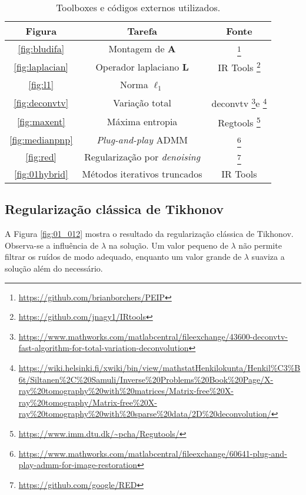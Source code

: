 {\centering 
\begin{longtable}{|| c  c  c || }
\caption{Toolboxes e códigos externos utilizados.}
\label{Table:especificacoes_estudo}  \\ \hline
 \rowcolor{lightyellow} \textbf{Figura} & \textbf{Tarefa} & \textbf{Fonte} \\ \hline\hline
\ref{fig:bludifa} & Montagem de $\mathbf{A}$ &  \cite[Exemplo 6.2]{aster2019parameter}\footnote{\url{https://github.com/brianborchers/PEIP}} \\
\ref{fig:laplacian} & Operador laplaciano $\mathbf{L}$ & IR Tools \cite{Gazzola2018}\footnote{\url{https://github.com/jnagy1/IRtools}} \\
\ref{fig:l1} & Norma $\ell_1$& \cite[Algoritmos 7.2-4]{aster2019parameter}\\
\ref{fig:deconvtv} & Variação total & deconvtv \cite{Chan2011}\footnote{\url{https://www.mathworks.com/matlabcentral/fileexchange/43600-deconvtv-fast-algorithm-for-total-variation-deconvolution}}e  \cite{Mueller2012}\footnote{\url{https://wiki.helsinki.fi/xwiki/bin/view/mathstatHenkilokunta/Henkil\%C3\%B6t/Siltanen\%2C\%20Samuli/Inverse\%20Problems\%20Book\%20Page/X-ray\%20tomography\%20with\%20matrices/Matrix-free\%20X-ray\%20tomography/Matrix-free\%20X-ray\%20tomography\%20with\%20sparse\%20data/2D\%20deconvolution/}} \\
\ref{fig:maxent} & Máxima entropia & Regtools \cite{Hansen2007}\footnote{\url{https://www.imm.dtu.dk/~pcha/Regutools/}} \\ 
\ref{fig:medianpnp} &  \textit{Plug-and-play} ADMM &  \cite{Chan2016}\footnote{\url{https://www.mathworks.com/matlabcentral/fileexchange/60641-plug-and-play-admm-for-image-restoration}} \\
\ref{fig:red} & Regularização por \textit{denoising} &  \cite{Romano2017}\footnote{\url{https://github.com/google/RED}} \\
\ref{fig:01hybrid} & Métodos iterativos truncados & IR Tools \cite{Gazzola2018}\\ \hline
\end{longtable}
}



\subsection{Regularização clássica de Tikhonov}

A Figura \ref{fig:01_012} mostra o resultado da regularização clássica de Tikhonov. Observa-se a influência de $\lambda$ na solução. Um valor pequeno de $\lambda$ não permite filtrar os ruídos de modo adequado, enquanto um valor grande de $\lambda$ suaviza a solução além do necessário. 

